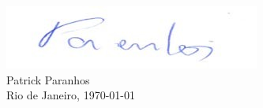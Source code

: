 \documentclass[12pt,a4paper,roman]{moderncv} %
\begin{document}
\begin{center}
\includegraphics{patrick.png}\\ 
Patrick Paranhos\\
Rio de Janeiro, \today
\end{center}


\end{document}
